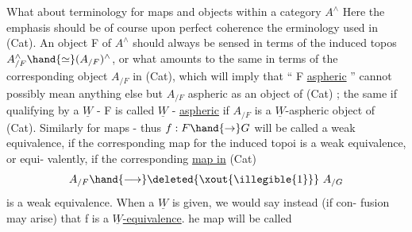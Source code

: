 What about terminology for maps and objects within a category $A^{\wedge}$
Here the emphasis should be of course upon perfect coherence 
the erminology used in (Cat). An object F of $A^{\wedge}$ should always be sensed
in terms of the induced topos $A^{\wedge}_{/F}\hand{\ensuremath{\simeq}}(A_{/F})^{\wedge}$, or what amounts to the same\hand{,}
in terms of the corresponding object $A_{/F}$ in (Cat), which will imply 
that `` F  \uline{aspheric} '' cannot possibly mean anything else but $A_{/F}$  aspheric
as an object of (Cat) ; the same if qualifying by a $\underline{W}$ - F is called
$\underline{W}$ - \uline{aspheric} if $A_{/F}$ is a $\underline{W}$-aspheric object of (Cat). Similarly\xout{,} for
maps - thus $f: F\hand{\to}G$ will be called a weak equivalence, if the
corresponding map for the induced topoi is a weak equivalence, or equi-%
valently, if the corresponding \uline{map in} (Cat)
\[ A_{/F}\hand{\longrightarrow} \deleted{\xout{\illegible{1}}}\ A_{/G} \]
is a weak equivalence. When a $\underline{W}$ is given, we would say instead (if con-%
fusion may arise) that f is a \uline{$\underline{W}$-equivalence}. he map will be called

